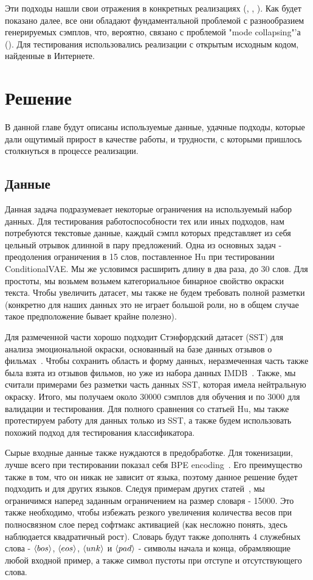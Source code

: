\documentclass{spbau-diploma}
\begin{document}
Эти подходы нашли свои отражения в конкретных реализациях 
(\cite{seqgan}, \cite{leakgan}, \cite{gsgan}). Как будет показано далее, все 
они обладают фундаментальной проблемой с разнообразием генерируемых сэмплов, 
что, вероятно, связано с проблемой "mode collapsing"'а 
(\cite{mode_collapsing}). Для тестирования использовались реализации с открытым 
исходным кодом, найденные в Интернете.

\section{Решение}
В данной главе будут описаны используемые данные, удачные подходы, 
которые дали ощутимый прирост в качестве работы, и трудности, с которыми 
пришлось столкнуться в процессе реализации.

\subsection{Данные}
Данная задача подразумевает некоторые ограничения на используемый набор данных.
Для тестирования работоспособности тех или иных подходов, нам потребуются 
текстовые данные, каждый сэмпл которых представляет из себя цельный отрывок
длинной в пару предложений. Одна из основных задач - преодоления ограничения в 
15 слов, поставленное Hu \cite{text_cvae} при тестировании ConditionalVAE. Мы же
условимся расширить длину в два раза, до 30 слов. Для простоты, мы возьмем
возьмем категориальное бинарное свойство окраски текста. Чтобы увеличить
датасет, мы также не будем требовать полной разметки (конкретно для наших 
данных это не играет большой роли, но в общем случае такое предположение 
бывает крайне полезно).

Для размеченной части хорошо подходит Стэнфордский датасет (SST) для анализа 
эмоциональной окраски, основанный на базе данных отзывов о фильмах~\cite{sst}.
Чтобы сохранить область и форму данных, неразмеченная часть также была взята
из отзывов фильмов, но уже из набора данных IMDB~\cite{imdb}. Также, мы считали 
примерами без разметки часть данных SST, которая имела нейтральную окраску. 
Итого, мы получаем около 30000 сэмплов для обучения и по 3000 для валидации и 
тестирования. Для полного сравнения со статьей Hu, мы также протестируем работу
для данных только из SST, а также будем использовать похожий подход для 
тестирования классификатора.

Сырые входные данные также нуждаются в предобработке. Для токенизации, лучше 
всего при тестировании показал себя BPE encoding~\cite{wiki:bpe}. Его 
преимущество также в том, что он никак не зависит от языка, поэтому данное 
решение будет подходить и для других языков. Следуя примерам других 
статей~\cite{text_vae}, мы ограничимся наперед заданным ограничением на размер 
словаря - 15000. Это также необходимо, чтобы избежать резкого увеличения 
количества весов при полносвязном слое перед софтмакс активацией (как несложно 
понять, здесь наблюдается квадратичный рост). Словарь будут также дополнять 4 
служебных слова - $\langle bos \rangle$, $\langle eos \rangle$, $\langle unk \rangle$ и $\langle pad \rangle$ - символы начала и конца, 
обрамляющие любой входной пример, а также символ пустоты при отступе и 
отсутствующего слова.
\end{document}
